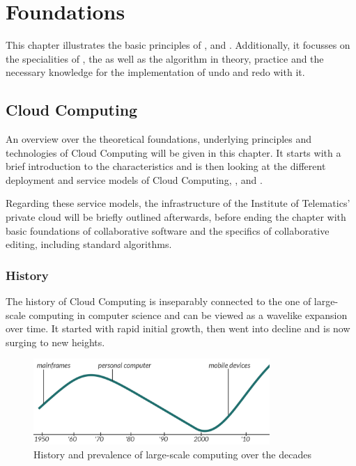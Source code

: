 \chapter{Foundations}
This chapter illustrates the basic principles of ,  and . Additionally, it focusses on the specialities of , the as well as the  algorithm in theory, practice and the necessary knowledge for the implementation of undo and redo with it.

\section{Cloud Computing}
\label{sec:cloud-computing}

An overview over the theoretical foundations, underlying principles and technologies of Cloud Computing will be given in this chapter. It starts with a brief introduction to the characteristics and is then looking at the different deployment and service models of Cloud Computing, ,  and . 

Regarding these service models, the infrastructure of the Institute of Telematics' private cloud will be briefly outlined afterwards, before ending the chapter with basic foundations of collaborative software and the specifics of collaborative editing, including standard algorithms.

\subsection{History}
\label{subsec:cloud-history}
The history of Cloud Computing is inseparably connected to the one of large-scale computing in computer science and can be viewed as a wavelike expansion over time. It started with rapid initial growth, then went into decline and is now surging to new heights.

\begin{figure}[h!]
	\centering
		\includegraphics[width=0.8\textwidth]{images/computing_expansion.pdf}
	\caption{History and prevalence of large-scale computing over the decades}
\end{figure}

